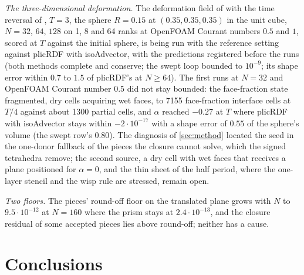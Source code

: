 \documentclass[preprint,12pt]{elsarticle}
\begin{document}
\emph{The three-dimensional deformation.} The deformation field of \citet{LeVeque1996} with the time reversal of \citet{EnrightEtAl2002}, $T = 3$, the sphere $R = 0.15$ at $(0.35, 0.35, 0.35)$ in the unit cube, $N = 32$, $64$, $128$ on 1, 8 and 64 ranks at OpenFOAM Courant numbers $0.5$ and $1$, scored at $T$ against the initial sphere, is being run with the reference setting against plicRDF with isoAdvector, with the predictions registered before the runs (both methods complete and conserve; the swept loop bounded to $10^{-9}$; its shape error within $0.7$ to $1.5$ of plicRDF's at $N \ge 64$). The first runs at $N = 32$ and OpenFOAM Courant number $0.5$ did not stay bounded: the face-fraction state fragmented, dry cells acquiring wet faces, to 7155 face-fraction interface cells at $T/4$ against about 1300 partial cells, and $\alpha$ reached $-0.27$ at $T$ where plicRDF with isoAdvector stays within $-2\cdot10^{-17}$ with a shape error of $0.55$ of the sphere's volume (the swept row's $0.80$). The diagnosis of \cref{sec:method} located the seed in the one-donor fallback of the pieces the closure cannot solve, which the signed tetrahedra remove; the second source, a dry cell with wet faces that receives a plane positioned for $\alpha = 0$, and the thin sheet of the half period, where the one-layer stencil and the wisp rule are stressed, remain open.

\emph{Two floors.} The pieces' round-off floor on the translated plane grows with $N$ to $9.5\cdot10^{-12}$ at $N = 160$ where the prism stays at $2.4\cdot10^{-13}$, and the closure residual of some accepted pieces lies above round-off; neither has a cause.

\section{Conclusions}
\label{sec:concl}
\end{document}

